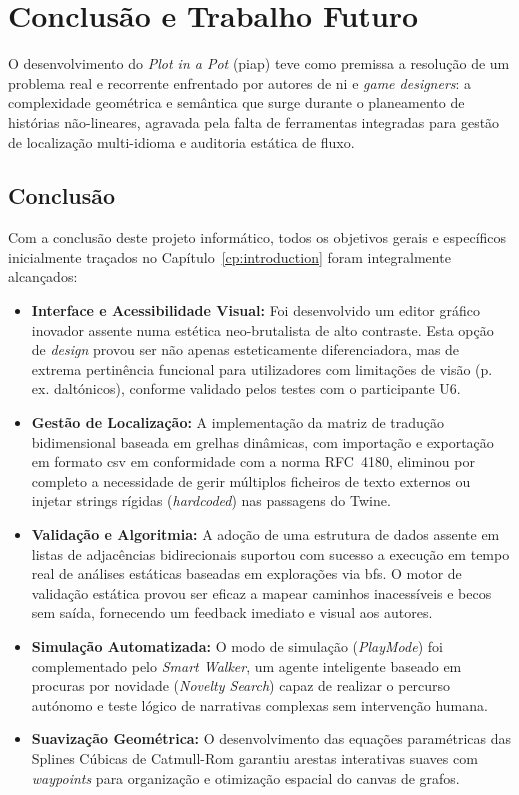\chapter{Conclusão e Trabalho Futuro}
\label{cp:conclusao}

O desenvolvimento do \textit{Plot in a Pot} (\gls{piap}) teve como premissa a resolução de um problema real e recorrente enfrentado por autores de \gls{ni} e \textit{game designers}: a complexidade geométrica e semântica que surge durante o planeamento de histórias não-lineares, agravada pela falta de ferramentas integradas para gestão de localização multi-idioma e auditoria estática de fluxo.

\section{Conclusão}
\label{sec:conclusao-recap}

Com a conclusão deste projeto informático, todos os objetivos gerais e específicos inicialmente traçados no Capítulo~\ref{cp:introduction} foram integralmente alcançados:
\begin{itemize}
    \item \textbf{Interface e Acessibilidade Visual:} Foi desenvolvido um editor gráfico inovador assente numa estética neo-brutalista de alto contraste. Esta opção de \textit{design} provou ser não apenas esteticamente diferenciadora, mas de extrema pertinência funcional para utilizadores com limitações de visão (p. ex. daltónicos), conforme validado pelos testes com o participante U6.
    \item \textbf{Gestão de Localização:} A implementação da matriz de tradução bidimensional baseada em grelhas dinâmicas, com importação e exportação em formato \gls{csv} em conformidade com a norma RFC~4180, eliminou por completo a necessidade de gerir múltiplos ficheiros de texto externos ou injetar strings rígidas (\textit{hardcoded}) nas passagens do Twine.
    \item \textbf{Validação e Algoritmia:} A adoção de uma estrutura de dados assente em listas de adjacências bidirecionais suportou com sucesso a execução em tempo real de análises estáticas baseadas em explorações via \gls{bfs}. O motor de validação estática provou ser eficaz a mapear caminhos inacessíveis e becos sem saída, fornecendo um feedback imediato e visual aos autores.
    \item \textbf{Simulação Automatizada:} O modo de simulação (\textit{PlayMode}) foi complementado pelo \textit{Smart Walker}, um agente inteligente baseado em procuras por novidade (\textit{Novelty Search}) capaz de realizar o percurso autónomo e teste lógico de narrativas complexas sem intervenção humana.
    \item \textbf{Suavização Geométrica:} O desenvolvimento das equações paramétricas das Splines Cúbicas de Catmull-Rom garantiu arestas interativas suaves com \textit{waypoints} para organização e otimização espacial do canvas de grafos.
\end{itemize}

